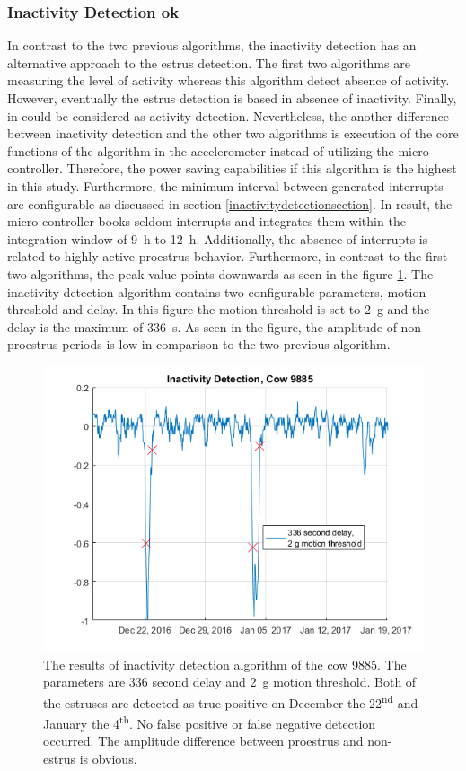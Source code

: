 \documentclass[english,12pt,a4paper,pdftex,elec,utf8]{aaltothesis}
\begin{document}
\subsubsection{Inactivity Detection ok}\label{inactivitydetectionevaluation}

In contrast to the two previous algorithms, the inactivity detection has an alternative approach to the estrus detection. The first two algorithms are measuring the level of activity whereas this algorithm detect absence of activity. However, eventually the estrus detection is based in absence of inactivity. Finally, in could be considered as activity detection. Nevertheless, the another difference between inactivity detection and the other two algorithms is execution of the core functions of the algorithm in the accelerometer instead of utilizing the micro-controller. Therefore, the power saving capabilities if this algorithm is the highest in this study. Furthermore, the minimum interval between generated interrupts are configurable as discussed in section \ref{inactivitydetectionsection}. In result, the micro-controller books seldom interrupts and integrates them within the integration window of \SI{9}{\hour} to \SI{12}{\hour}. Additionally, the absence of interrupts is related to highly active proestrus behavior. Furthermore, in contrast to the first two algorithms, the peak value points downwards as seen in the figure \ref{InactivityDetectionCow9885}. The inactivity detection algorithm contains two configurable parameters, motion threshold and delay. In this figure the motion threshold is set to \SI{2}{\gram} and the delay is the maximum of \SI{336}{s}. As seen in the figure, the amplitude of non-proestrus periods is low in comparison to the two previous algorithm.


\begin{figure}[htb]
\centering
\includegraphics[width = 0.75 \textwidth]{figures/InactivityDetectionCow9885.png}
\caption{The results of inactivity detection algorithm of the cow 9885. The parameters are 336 second delay and \SI{2}{\gram} motion threshold. Both of the estruses are detected as true positive on December the 22\textsuperscript{nd} and January the 4\textsuperscript{th}. No false positive or false negative detection occurred. The amplitude difference between proestrus and non-estrus is obvious.}
\label{InactivityDetectionCow9885}
\end{figure}
\end{document}
